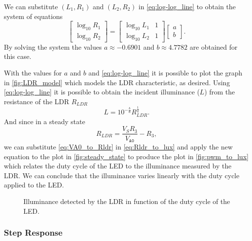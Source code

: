 We can substitute $(L_1, R_1)$ and $(L_2, R_2)$ in \eqref{eq:log-log_line} to obtain the system of equations
\begin{equation} \label{eq:log-log_line_system}
    \begin{bmatrix}
	\log_{10}R_1 \\ \log_{10}R_2
    \end{bmatrix}
    =
    \begin{bmatrix}
	\log_{10}L_1  &  1 \\
	\log_{10}L_2  &  1
    \end{bmatrix}
    \begin{bmatrix}
	a \\ b
    \end{bmatrix}.
\end{equation}
By solving the system the values $a \approx -0.6901$ and $b \approx 4.7782$ are obtained for this case.

With the values for $a$ and $b$ and \eqref{eq:log-log_line} it is possible to plot the graph in \autoref{fig:LDR_model} which models the LDR characteristic, as desired. Using \eqref{eq:log-log_line} it is possible to obtain the incident illuminance ($L$) from the resistance of the LDR $R_{LDR}$
\begin{equation} \label{eq:Rldr_to_lux}
    L = 10^{-\frac{b}{a}} R_{LDR}^{\frac{1}{a}} .
\end{equation}
And since in a steady state
\begin{equation} \label{eq:VA0_to_Rldr}
    R_{LDR} = \frac{V_S R_3}{V_{\texttt{A0}}} - R_3 ,
\end{equation}
we can substitute \eqref{eq:VA0_to_Rldr} in \eqref{eq:Rldr_to_lux} and apply the new equation to the plot in \autoref{fig:steady_state} to produce the plot in \autoref{fig:pwm_to_lux} which relates the duty cycle of the LED to the illuminance measured by the LDR. We can conclude that the illuminance varies linearly with the duty cycle applied to the LED.

\begin{figure}[h]
    \centering
    \resizebox{0.75\textwidth}{!}{}
    \caption{Illuminance detected by the LDR in function of the duty cycle of the LED.}
    \label{fig:pwm_to_lux}
\end{figure}


\subsubsection{Step Response}
\label{sub:StepResponse}

